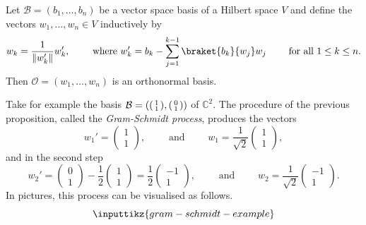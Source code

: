 \documentclass[a4paper,oneside, 12pt]{amsart}
\begin{document}
\begin{proposition}\label{prop:existence-of-onb}
  Let \(\mathcal{B} = (b_{1}, \dots , b_{n})\) be a vector space basis of a Hilbert space \(V\) and define the vectors \(w_{1}, \dots , w_{n}\in V\) inductively by
  \begin{equation*}
    w_{k} = \frac{1}{\|w_{k}'\|} w_{k}', \qquad \text{ where }
    w_{k}' = b_{k} - \sum_{j=1}^{k-1}\braket{ b_{k}}{ w_{j}}w_{j} \qquad \text{ for all } 1\leq k \leq n.
  \end{equation*}
  Then \(\mathcal{O} = (w_{1}, \dots , w_{n})\)  is  an orthonormal basis.
\end{proposition}
Take for example the basis \(\mathcal{B} = \left(
  \begin{psmallmatrix}
    1  \\ 1
  \end{psmallmatrix},
  \begin{psmallmatrix}
    0 \\ 1
  \end{psmallmatrix}
\right)\) of \( \mathbb{C}^{2}\).
The procedure of the previous proposition, called the \emph{Gram-Schmidt process}, produces the vectors
\begin{equation*}
  w_{1}'=
  \begin{pmatrix}
    1 \\ 1
  \end{pmatrix}, \qquad \text{ and }\qquad
    w_{1} = \frac{1}{\sqrt{2}}
  \begin{pmatrix}
    1 \\ 1
  \end{pmatrix},
\end{equation*}
and in the second step
\begin{equation*}
  w_{2}' =
  \begin{pmatrix}
    0 \\ 1
  \end{pmatrix} - \frac{1}{2}
  \begin{pmatrix}
    1 \\ 1
  \end{pmatrix}
  = \frac{1}{2}
  \begin{pmatrix}
    -1 \\ 1
  \end{pmatrix}, \qquad \text{ and } \qquad
  w_{2} = \frac{1}{\sqrt{2}}
  \begin{pmatrix}
    -1 \\ 1
  \end{pmatrix}.
\end{equation*}
In pictures, this process can be visualised as follows.
\begin{equation*}
  \inputtikz{gram-schmidt-example}
\end{equation*}
\end{document}
